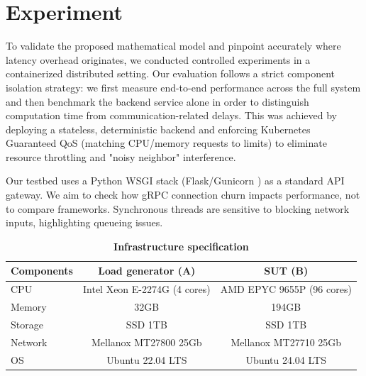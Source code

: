 \documentclass{ieeeaccess}
\begin{document}
\section{Experiment}
\label{sec4}

To validate the proposed mathematical model and pinpoint accurately where latency overhead originates, we conducted controlled experiments in a containerized distributed setting. Our evaluation follows a strict component isolation strategy: we first measure end-to-end performance across the full system and then benchmark the backend service alone in order to distinguish computation time from communication-related delays. This was achieved by deploying a stateless, deterministic backend and enforcing Kubernetes Guaranteed QoS (matching CPU/memory requests to limits) to eliminate resource throttling and "noisy neighbor" interference. 

Our testbed uses a Python WSGI stack (Flask/Gunicorn \cite{gunicorn}) as a standard API gateway. We aim to check how gRPC connection churn impacts performance, not to compare frameworks. Synchronous threads are sensitive to blocking network inputs, highlighting queueing issues.



\begin{table}[htbp]
	\centering
	\caption{\textbf{Infrastructure specification}}
	\label{table1}
	\setlength{\tabcolsep}{3pt}
		\begin{tabular}{lcc}
			\hline
			\textbf{Components}& \textbf{Load generator (A)}& \textbf{SUT (B)}\\
			\hline
			CPU & Intel Xeon E-2274G (4 cores)& AMD EPYC 9655P (96 cores)\\
			Memory & 32GB & 194GB\\
			Storage & SSD 1TB & SSD 1TB\\
			Network & Mellanox MT27800 25Gb & Mellanox MT27710 25Gb\\
			OS & Ubuntu 22.04 LTS & Ubuntu 24.04 LTS\\
			\hline
	\end{tabular}
\end{table}
\end{document}
